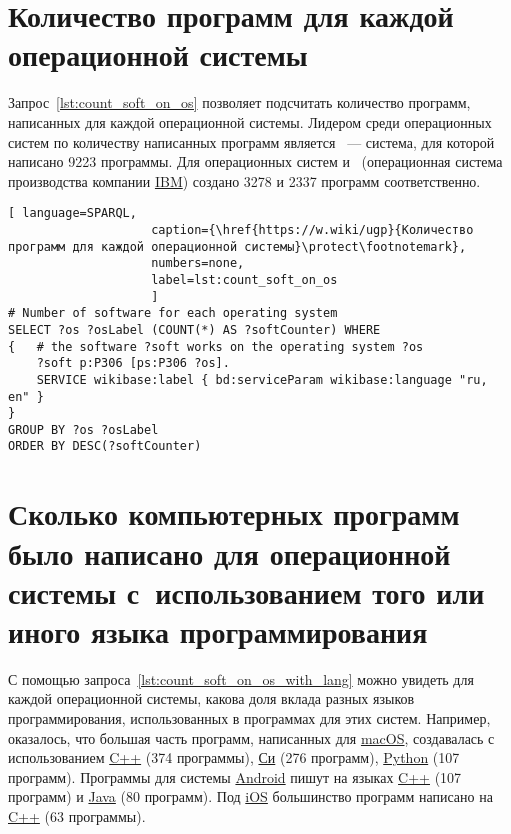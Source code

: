 \section{Количество программ для каждой операционной системы}

Запрос~\ref{lst:count_soft_on_os} позволяет подсчитать количество программ, 
написанных для каждой операционной системы.
Лидером среди операционных систем по количеству написанных программ 
    является ~--- система, для которой написано \num{9223} программы. 
    Для операционных систем  и~ 
    (операционная система производства компании \href{https://www.wikidata.org/wiki/Q37156}{IBM}) 
    создано \num{3278} и \num{2337} программ соответственно.


\newpage
\begin{lstlisting}[ language=SPARQL, 
                    caption={\href{https://w.wiki/ugp}{Количество программ для каждой операционной системы}\protect\footnotemark},
                    numbers=none,
                    label=lst:count_soft_on_os
                    ]
# Number of software for each operating system
SELECT ?os ?osLabel (COUNT(*) AS ?softCounter) WHERE
{   # the software ?soft works on the operating system ?os
    ?soft p:P306 [ps:P306 ?os].
    SERVICE wikibase:label { bd:serviceParam wikibase:language "ru, en" }
}
GROUP BY ?os ?osLabel
ORDER BY DESC(?softCounter)
\end{lstlisting}





\section{Сколько компьютерных программ было написано для операционной системы с~использованием того или иного языка программирования}

С помощью запроса~\ref{lst:count_soft_on_os_with_lang} можно увидеть для каждой операционной системы, 
какова доля вклада разных языков программирования, использованных в программах для этих систем. 
Например, оказалось, что большая часть программ, 
написанных для \href{https://www.wikidata.org/wiki/Q14116}{macOS}, 
создавалась с использованием \href{https://www.wikidata.org/wiki/Q2407}{C++} (374 программы), 
\href{https://www.wikidata.org/wiki/Q15777}{Си} (276 программ), 
\href{https://www.wikidata.org/wiki/Q28865}{Python} (107 программ).
Программы для системы \href{https://www.wikidata.org/wiki/Q94}{Android} пишут 
на языках \href{https://www.wikidata.org/wiki/Q2407}{C++} (107 программ) 
и \href{https://www.wikidata.org/wiki/Q251}{Java} (80 программ).
Под \href{https://www.wikidata.org/wiki/Q48493}{iOS} большинство программ 
написано на \href{https://www.wikidata.org/wiki/Q2407}{C++} (63 программы).

